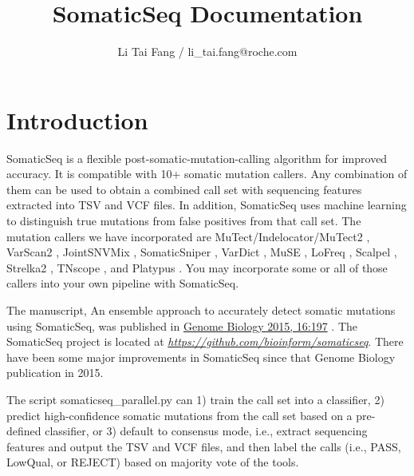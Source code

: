 \documentclass[10pt,letterpaper]{article}
\author{Li Tai Fang / li\_tai.fang@roche.com}
\title{SomaticSeq Documentation}
\begin{document}
\maketitle



\begin{sloppypar}




\tableofcontents


\setlength{\parskip}{\baselineskip}


\section{Introduction} \label{Introduction}

SomaticSeq is a flexible post-somatic-mutation-calling algorithm for improved accuracy. It is compatible with 10+ somatic mutation callers. Any combination of them can be used to obtain a combined call set with sequencing features extracted into TSV and VCF files. In addition, SomaticSeq uses machine learning to distinguish true mutations from false positives from that call set. The mutation callers we have incorporated are MuTect/Indelocator/MuTect2 \cite{mutect}, VarScan2 \cite{varscan2}, JointSNVMix \cite{jointsnvmix2}, SomaticSniper \cite{somaticsniper}, VarDict \cite{vardict}, MuSE \cite{muse}, LoFreq \cite{lofreq}, Scalpel \cite{scalpel}, Strelka2 \cite{strelka2}, TNscope \cite{tnscope}, and Platypus \cite{platypus}. You may incorporate some or all of those callers into your own pipeline with SomaticSeq.


The manuscript, An ensemble approach to accurately detect somatic mutations using SomaticSeq, was published in \href{http://dx.doi.org/10.1186/s13059-015-0758-2}{Genome Biology 2015, 16:197} \cite{Fang_2015}. 
The SomaticSeq project is located at \href{https://github.com/bioinform/somaticseq}{\textit{https://github.com/bioinform/somaticseq}}. 
There have been some major improvements in SomaticSeq since that Genome Biology publication in 2015. 

The script  somaticseq\_parallel.py can 1) train the call set into a classifier, 2) predict high-confidence somatic mutations from the call set based on a pre-defined classifier, or 3) default to consensus mode, i.e., extract sequencing features and output the TSV and VCF files, and then label the calls (i.e., PASS, LowQual, or REJECT) based on majority vote of the tools.




\end{sloppypar}
\end{document}
